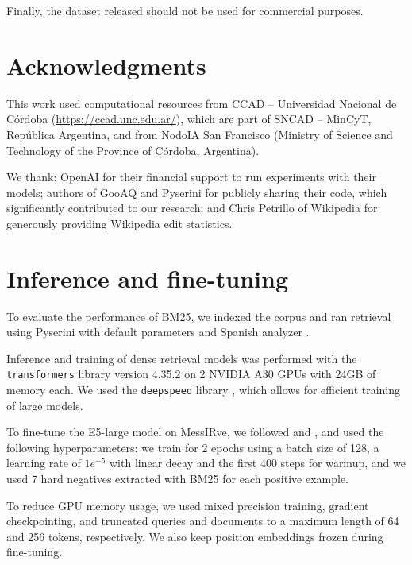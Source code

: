 \documentclass[11pt]{article}
\begin{document}
Finally, the dataset released should not be used for commercial purposes.


\section*{Acknowledgments}

This work used computational resources from CCAD -- Universidad Nacional de Córdoba (\url{https://ccad.unc.edu.ar/}), which are part of SNCAD -- MinCyT, República Argentina, and from NodoIA San Francisco (Ministry of Science and Technology of the Province of Córdoba, Argentina).

We thank: OpenAI for their financial support to run experiments with their models; authors of GooAQ \citep{khashabi-etal-2021-gooaq-open} and Pyserini \citep{Lin_etal_SIGIR2021_Pyserini} for publicly sharing their code, which significantly contributed to our research; and Chris Petrillo of Wikipedia for generously providing Wikipedia edit statistics.


% 

\appendix


\section{Inference and fine-tuning} \label{app:fine_tuning}

To evaluate the performance of BM25, we indexed the corpus and ran retrieval using Pyserini with default parameters and Spanish analyzer \citep{Lin_etal_SIGIR2021_Pyserini}.

Inference and training of dense retrieval models was performed with the \texttt{transformers} library version 4.35.2 \citep{wolf2020transformers} on 2 NVIDIA A30 GPUs with 24GB of memory each. We used the \texttt{deepspeed} library \citep{rasley2020deepspeed}, which allows for efficient training of large models.

To fine-tune the E5-large model on MessIRve, we followed \citet{wang2024multilingual} and \citet{wang2024text}, and used the following hyperparameters: we train for 2 epochs using a batch size of 128, a learning rate of $1e^{-5}$ with linear decay and the first 400 steps for warmup, and we used 7 hard negatives extracted with BM25 for each positive example.

To reduce GPU memory usage, we used mixed precision training, gradient checkpointing, and truncated queries and documents to a maximum length of 64 and 256 tokens, respectively. We also keep position embeddings frozen during fine-tuning.
\end{document}
